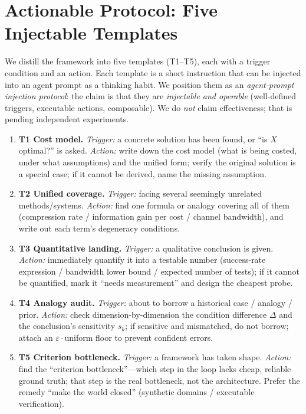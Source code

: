 \section{Actionable Protocol: Five Injectable Templates}
\label{sec:protocol}

We distill the framework into five templates (T1--T5), each with a trigger
condition and an action. Each template is a short instruction that can be
injected into an agent prompt as a thinking habit. We position them as an
\emph{agent-prompt injection protocol}: the claim is that they are
\emph{injectable and operable} (well-defined triggers, executable actions,
composable). We do \emph{not} claim effectiveness; that is pending independent
experiments.

\begin{enumerate}[leftmargin=2em,itemsep=2pt]
\item \textbf{T1 Cost model.} \emph{Trigger:} a concrete solution has been
found, or ``is $X$ optimal?'' is asked. \emph{Action:} write down the cost model
(what is being costed, under what assumptions) and the unified form; verify the
original solution is a special case; if it cannot be derived, name the missing
assumption.
\item \textbf{T2 Unified coverage.} \emph{Trigger:} facing several seemingly
unrelated methods/systems. \emph{Action:} find one formula or analogy covering
all of them (compression rate / information gain per cost / channel bandwidth),
and write out each term's degeneracy conditions.
\item \textbf{T3 Quantitative landing.} \emph{Trigger:} a qualitative conclusion
is given. \emph{Action:} immediately quantify it into a testable number
(success-rate expression / bandwidth lower bound / expected number of tests); if
it cannot be quantified, mark it ``needs measurement'' and design the cheapest
probe.
\item \textbf{T4 Analogy audit.} \emph{Trigger:} about to borrow a historical
case / analogy / prior. \emph{Action:} check dimension-by-dimension the
condition difference $\Delta$ and the conclusion's sensitivity $s_k$; if
sensitive and mismatched, do not borrow; attach an $\varepsilon\cdot$uniform
floor to prevent confident errors.
\item \textbf{T5 Criterion bottleneck.} \emph{Trigger:} a framework has taken
shape. \emph{Action:} find the ``criterion bottleneck''---which step in the loop
lacks cheap, reliable ground truth; that step is the real bottleneck, not the
architecture. Prefer the remedy ``make the world closed'' (synthetic domains /
executable verification).
\end{enumerate}

